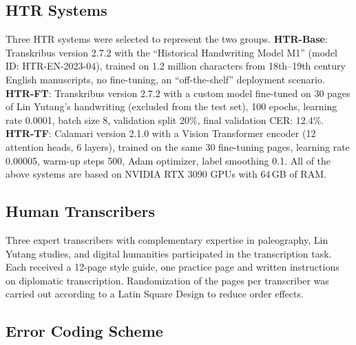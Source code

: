 \documentclass[final]{anthology-ch} %
\begin{document}
\subsection{HTR Systems}

Three HTR systems were selected to represent the two groups. \textbf{HTR-Base}: Transkribus version 2.7.2 with the \enquote{Historical Handwriting Model M1} (model ID: HTR-EN-2023-04), trained on 1.2 million characters from 18th--19th century English manuscripts, no fine-tuning, an \enquote{off-the-shelf} deployment scenario. \textbf{HTR-FT}: Transkribus version 2.7.2 with a custom model fine-tuned on 30 pages of Lin Yutang's handwriting (excluded from the test set), 100 epochs, learning rate 0.0001, batch size 8, validation split 20\%, final validation CER: 12.4\%. \textbf{HTR-TF}: Calamari version 2.1.0 with a Vision Transformer encoder (12 attention heads, 6 layers), trained on the same 30 fine-tuning pages, learning rate 0.00005, warm-up steps 500, Adam optimizer, label smoothing 0.1. All of the above systems are based on NVIDIA RTX 3090 GPUs with 64\,GB of RAM.

\subsection{Human Transcribers}

Three expert transcribers with complementary expertise in paleography, Lin Yutang studies, and digital humanities participated in the transcription task. Each received a 12-page style guide, one practice page and written instructions on diplomatic transcription. Randomization of the pages per transcriber was carried out according to a Latin Square Design to reduce order effects.

\subsection{Error Coding Scheme}
\end{document}
